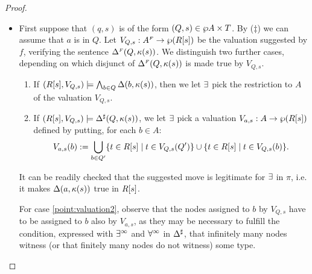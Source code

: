 \begin{proof}
\begin{enumerate}[(1)]
\begin{itemize}
\item 
First suppose that $(q,s)$ is of the form $(Q,s) \in \wp A\times T$. 
By ($\ddag$) we can assume that $a$ is in $Q$. 
Let $V_{Q,s} :A^{{\scriptscriptstyle F}} \rightarrow \wp(R[s])$ be the valuation suggested by 
$f$, verifying the sentence $\Delta^{{\scriptscriptstyle F}}(Q,\kappa(s))$. 
We distinguish two further cases, depending on which disjunct of 
$\Delta^{{\scriptscriptstyle F}}(Q,\kappa(s))$ is made true by $V_{Q,s}$.
\begin{enumerate}[label=(\roman*), ref=\roman*]
\item 
\label{point:valuation1}
If $(R[s],V_{Q,s})\models \bigwedge_{b \in Q} \Delta(b,\kappa(s))$, then we let 
$\exists$ pick the restriction to $A$ of the valuation $V_{Q,s}$. 
\item 
\label{point:valuation2}
If $(R[s],V_{Q,s})\models \Delta^{\sharp}(Q,\kappa(s))$, we let $\exists$ pick a valuation
$V_{a,s}:A \rightarrow \wp (R[s])$ defined by putting, for each $b \in A$:
\begin{align*}
V_{a,s}(b) \mathrel{:=} \bigcup_{b \in Q'} \{t \in R[s] \mid t \in V_{Q,s}(Q')\}
               \cup  \{t \in R[s] \mid t \in V_{Q,s}(b)\} .
\end{align*} 
\end{enumerate}
It can be readily checked that the suggested move is legitimate for $\exists$
in $\pi$, i.e. it makes $\Delta(a,\kappa(s))$ true in $R[s]$.

For case \eqref{point:valuation2}, observe that the nodes assigned to $b$ by
$V_{Q,s}$ have to be assigned to $b$ also by $V_{a,s}$, as they may be necessary
to fulfill the condition, expressed with $\exists^\infty$ and $\forall^\infty$ in $\Delta^{\sharp}$, that 
infinitely many nodes witness (or that finitely many nodes do not witness) 
some type.


\end{itemize}
\end{enumerate}
\end{proof}
